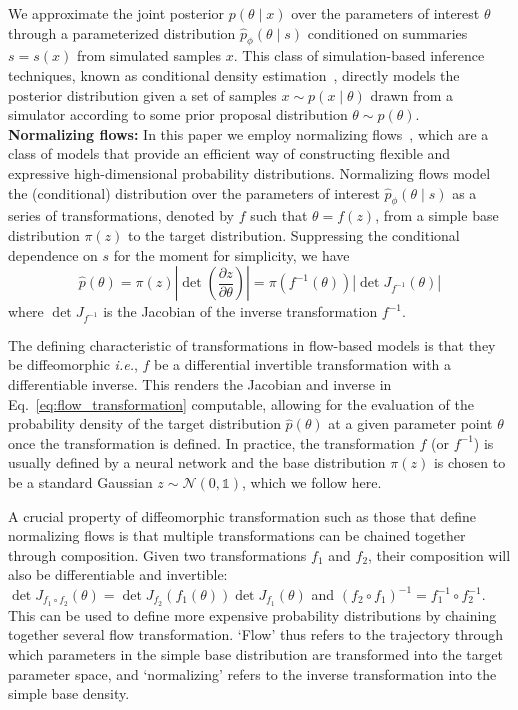 \documentclass[prd,aps,10pt,nofootinbib,twocolumn,superscriptaddress,preprintnumbers,balancelastpage,longbibliography]{revtex4-1}
\begin{document}
We approximate the joint posterior $p(\theta\mid x)$ over the parameters of interest $\theta$ through a parameterized distribution $\hat p_\phi(\theta\mid s)$ conditioned on summaries $s=s(x)$ from simulated samples $x$. This class of simulation-based inference techniques, known as conditional density estimation~\cite{papamakariosFastEpsilonFree2018}, directly models the posterior distribution given a set of samples $x\sim p(x\mid\theta)$ drawn from a simulator according to some prior proposal distribution $\theta\sim p(\theta)$. \\

\noindent
\textbf{Normalizing flows:}
In this paper we employ normalizing flows~\cite{papamakarios2019normalizing,rezende2015variational}, which are a class of models that provide an efficient way of constructing flexible and expressive high-dimensional probability distributions. Normalizing flows model the (conditional) distribution over the parameters of interest $\hat p_\phi(\theta\mid s)$ as a series of transformations, denoted by $f$ such that $\theta = f(z)$, from a simple base distribution $\pi({z})$ to the target distribution. Suppressing the conditional dependence on $s$ for the moment for simplicity, we have
\begin{equation}
    \label{eq:flow_transformation}
\hat{p}({\theta})=\pi(z)\left|\operatorname{det}\left(\frac{\partial z}{\partial {\theta}}\right)\right|=\pi(f^{-1}({\theta}))\left|\operatorname{det}J_{f^{-1}}(\theta)\right|
\end{equation}
where $\operatorname{det}J_{f^{-1}}$ is the Jacobian of the inverse transformation $f^{-1}$.

The defining characteristic of transformations in flow-based models is that they be diffeomorphic \emph{i.e.}, $f$ be a differential invertible transformation with a differentiable inverse. This renders the Jacobian and inverse in Eq.~\eqref{eq:flow_transformation} computable, allowing for the evaluation of the probability density of the target distribution $\hat{p}({\theta})$ at a given parameter point $\theta$ once the transformation is defined. In practice, the transformation $f$ (or $f^{-1}$) is usually defined by a neural network and the base distribution $\pi(z)$ is chosen to be a standard Gaussian $z\sim \mathcal N(0, \mathbb{1})$, which we follow here. 

A crucial property of diffeomorphic transformation such as those that define normalizing flows is that multiple transformations can be chained together through composition. Given two transformations $f_1$ and $f_2$, their composition will also be differentiable and invertible: $\operatorname{det}J_{f_{1}\circ f_2}(\theta) = \operatorname{det}J_{f_{2}}\left(f_1(\theta)\right)\operatorname{det}J_{f_{1}}(\theta)$ and $(f_2 \circ f_1)^{-1} = f_1^{-1} \circ f_2^{-1}$. This can be used to define more expensive probability distributions by chaining together several flow transformation. `Flow' thus refers to the trajectory through which parameters in the simple base distribution are transformed into the target parameter space, and `normalizing' refers to the inverse transformation into the simple base density.
\end{document}
